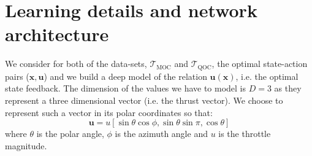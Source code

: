 \documentclass[graybox]{svmult}
\begin{document}





\section{Learning details and network architecture}
We consider for both of the data-sets, $\mathcal{T}_{\mbox{MOC}}$ and $\mathcal{T}_{\mbox{QOC}}$, the optimal state-action pairs ($\mathbf x, \mathbf u$) and we build a deep model of the relation $\mathbf u(\mathbf x)$, i.e. the optimal state feedback. The dimension of the values we have to model is $D=3$ as they represent a three dimensional vector (i.e. the thrust vector). We choose to represent such a vector in its polar coordinates so that:
$$
\mathbf u = u \left[
\sin{\theta}\cos{\phi},
\sin{\theta}\sin{\pi},
\cos{\theta}
\right]
$$
where $\theta$ is the polar angle, $\phi$ is the azimuth angle and $u$ is the throttle magnitude. 
\end{document}
